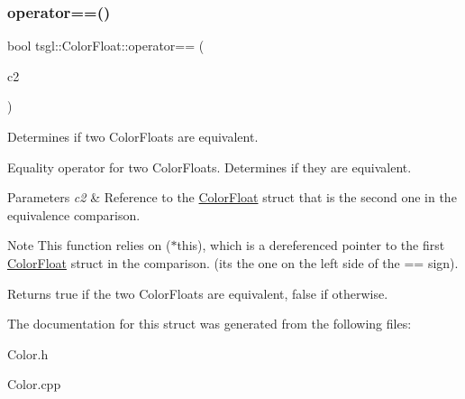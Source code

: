\subsubsection{\texorpdfstring{operator==()}{operator==()}}
{\footnotesize\ttfamily bool tsgl\+::\+Color\+Float\+::operator== (\begin{DoxyParamCaption}\item[{\hyperlink{structtsgl_1_1_color_float}{Color\+Float} \&}]{c2 }\end{DoxyParamCaption})}



Determines if two Color\+Floats are equivalent. 

Equality operator for two Color\+Floats. Determines if they are equivalent. 
\begin{DoxyParams}{Parameters}
{\em c2} & Reference to the \hyperlink{structtsgl_1_1_color_float}{Color\+Float} struct that is the second one in the equivalence comparison. \\
\hline
\end{DoxyParams}
\begin{DoxyNote}{Note}
This function relies on ($\ast$this), which is a dereferenced pointer to the first \hyperlink{structtsgl_1_1_color_float}{Color\+Float} struct in the comparison. (its the one on the left side of the == sign). 
\end{DoxyNote}
\begin{DoxyReturn}{Returns}
true if the two Color\+Floats are equivalent, false if otherwise. 
\end{DoxyReturn}


The documentation for this struct was generated from the following files\+:\begin{DoxyCompactItemize}
\item 
Color.\+h\item 
Color.\+cpp\end{DoxyCompactItemize}
